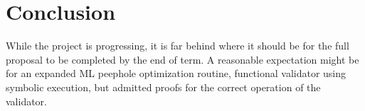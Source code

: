 \documentclass{article}
\begin{document}
\section{Conclusion}
While the project is progressing, it is far behind where it should be
for the full proposal to be completed by the end of term.  A
reasonable expectation might be for an expanded ML peephole
optimization routine, functional validator using symbolic execution,
but admitted proofs for the correct operation of the validator.
\end{document}
